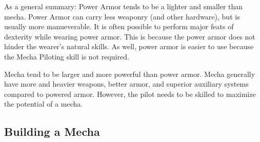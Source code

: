 \documentclass[twoside]{book}
\begin{document}
    {  
      As a general summary: Power Armor tends to be a
             lighter and smaller than mecha. Power Armor can carry less
             weaponry (and other hardware), but is usually more
             manueverable. It is often possible to perform major feats of
             dexterity while wearing power armor. This is because the
             power armor does not hinder the wearer's natural
             skills. As well, power armor is easier to use because the
             Mecha Piloting skill is not required. 
    }
  
    {  
      Mecha tend to be larger and more powerful than power
             armor. Mecha generally have more and heavier weapons, better
             armor, and superior auxiliary systems compared to powered
             armor. However, the pilot needs to be skilled to maximize
             the potential of a mecha. 
    }
  
    

\subsection{Building a Mecha}
    
\end{document}
